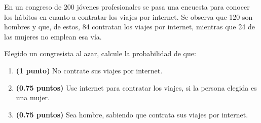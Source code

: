 
En un congreso de 200 jóvenes profesionales se pasa una encuesta para conocer los hábitos en cuanto a contratar los viajes por internet. Se observa que 120 son hombres y que, de estos, 84 contratan los viajes por internet, mientras que 24 de las mujeres no emplean esa vía.

Elegido un congresista al azar, calcule la probabilidad de que:
\begin{enumerate}[label=\alph*)]
\item \textbf{(1 punto)} No contrate sus viajes por internet.
\item \textbf{(0.75 puntos)} Use internet para contratar los viajes, si la persona elegida es una mujer.
\item \textbf{(0.75 puntos)} Sea hombre, sabiendo que contrata sus viajes por internet.
\end{enumerate}
